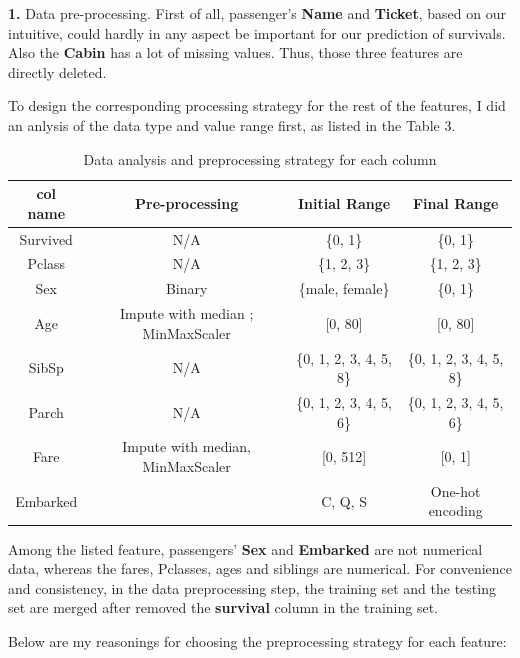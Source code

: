 \textbf{1.} Data pre-processing. 
First of all, passenger's \textbf{Name} and \textbf{Ticket}, based on our intuitive, could hardly in any aspect be important for our prediction of survivals. Also the \textbf{Cabin} has a lot of missing values. Thus, those three features are directly deleted. 

To design the corresponding processing strategy for the rest of the features, I did an anlysis of the data type and value range first, as listed in the Table 3.
\begin{table}[H]
    \centering
    \begin{tabular}{|c|c|c|c|}
        \hline 
        col name    &Pre-processing                     &Initial Range  &Final Range    \\
        \hline
        Survived    &N/A                                &\{0, 1\}       &\{0, 1\}         \\
        Pclass      &N/A                                &\{1, 2, 3\}    &\{1, 2, 3\}      \\
        Sex         &Binary                             &\{male, female\}       &\{0, 1\}         \\
        Age         &Impute with median ; MinMaxScaler  &[0, 80]    &[0, 80]        \\
        SibSp       &N/A                                &\{0, 1, 2, 3, 4, 5, 8\}    &\{0, 1, 2, 3, 4, 5, 8\}\\
        Parch       &N/A                                &\{0, 1, 2, 3, 4, 5, 6\}    &\{0, 1, 2, 3, 4, 5, 6\}\\
        Fare        &Impute with median, MinMaxScaler   &[0, 512]   &[0, 1]    \\
        Embarked    &                                   &{C, Q, S}  &One-hot encoding    \\
        \hline
    \end{tabular}
    \caption{Data analysis and preprocessing strategy for each column}
    \label{Data preprocessing}
\end{table}

Among the listed feature, passengers'  \textbf{Sex} and \textbf{Embarked} are not numerical data, whereas the fares, Pclasses, ages and siblings are numerical. For convenience and consistency, in the data preprocessing step, the training set and the testing set are merged after removed the \textbf{survival} column in the training set.

Below are my reasonings for choosing the preprocessing strategy for each feature:

